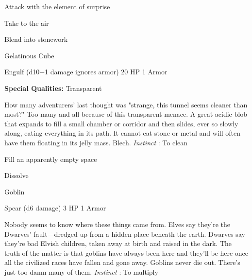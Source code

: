 \startitemize[1,packed]
         
\item Attack with the element of surprise

         
\item Take to the air

         
\item Blend into stonework

       
\stopitemize
       
\startMonsterName
Gelatinous Cube	 
\stopMonsterName
       

Engulf (d10+1 damage ignores armor)	20 HP	1 Armor

       


       
\startMonsterQualities
         {\bf Special Qualities:}  Transparent
\stopMonsterQualities
       
\startMonsterDescription
How many adventurers’ last thought was "strange, this tunnel seems cleaner than most?" Too many and all because of this transparent menace. A great acidic blob that expands to fill a small chamber or corridor and then slides, ever so slowly along, eating everything in its path. It cannot eat stone or metal and will often have them floating in its jelly mass. Blech. {\em Instinct} : To clean
\stopMonsterDescription
       
\startitemize[1,packed]
         
\item Fill an apparently empty space

         
\item Dissolve

       
\stopitemize
       
\startMonsterName
Goblin	 
\stopMonsterName
       

Spear (d6 damage)	3 HP	1 Armor

       


       
\startMonsterDescription
Nobody seems to know where these things came from. Elves say they’re the Dwarves’ fault—dredged up from a hidden place beneath the earth. Dwarves say they’re bad Elvish children, taken away at birth and raised in the dark. The truth of the matter is that goblins have always been here and they’ll be here once all the civilized races have fallen and gone away. Goblins never die out. There’s just too damn many of them. {\em Instinct} : To multiply
\stopMonsterDescription
       
